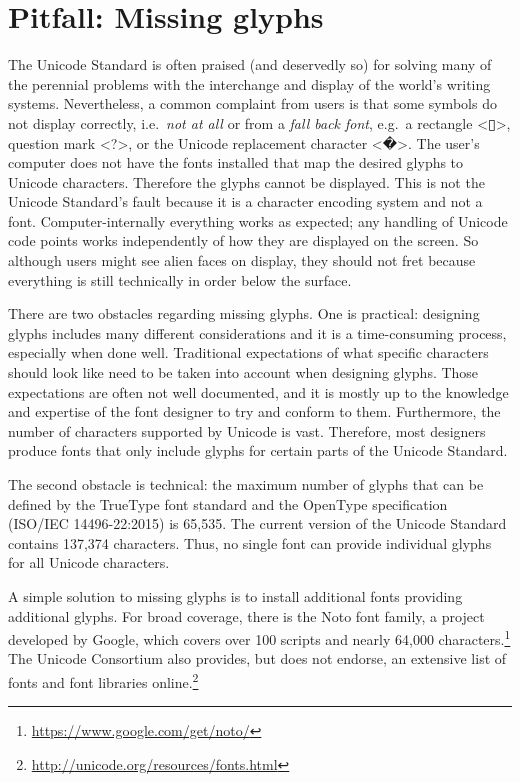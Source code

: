 \section{Pitfall: Missing glyphs}
\label{pitfall-missing-glyphs}

The Unicode Standard is often praised (and deservedly so) for solving many of
the perennial problems with the interchange and display of the world's writing
systems. Nevertheless, a common complaint from users is that some symbols do not display 
correctly, i.e.\ \textit{not at all} or from a \textit{fall back font}, e.g.\ a 
rectangle <▯>, question mark <?>, or the Unicode replacement character <�>. 
The user's computer does not have the fonts 
installed that map the desired glyphs to Unicode characters. Therefore the glyphs cannot be displayed.
This is not the Unicode Standard's fault because it is a character 
encoding system and not a font. Computer-internally everything works as expected; 
any handling of Unicode code points works independently of how they 
are displayed on the screen. So although users might see
alien faces on display, they should not fret because everything is still 
technically in order below the surface.

There are two obstacles regarding missing glyphs. One is practical: 
designing glyphs includes many different considerations and 
it is a time-consuming process, especially when done well. 
Traditional expectations of what specific characters should look like need
to be taken into account when designing glyphs. Those expectations are often not
well documented, and it is mostly up to the knowledge and expertise of the font
designer to try and conform to them. Furthermore, the number of characters 
supported by Unicode is vast. Therefore, most designers 
produce fonts that only include glyphs for certain parts of the Unicode
Standard. 

The second obstacle is technical: the maximum number of glyphs that can be 
defined by the TrueType font standard and the OpenType specification 
(ISO/IEC 14496-22:2015) is 65,535. The current version of the Unicode Standard 
contains 137,374 characters. Thus, no single font can provide individual 
glyphs for all Unicode characters.

A simple solution to missing glyphs is to install additional fonts
providing additional glyphs. For broad coverage, there is the Noto font family, a project developed by Google, 
which covers over 100 scripts and nearly 64,000 characters.\footnote{\url{https://www.google.com/get/noto/}} 
The Unicode Consortium also provides, but does not endorse, an extensive list of fonts and font libraries online.\footnote{\url{http://unicode.org/resources/fonts.html}}

